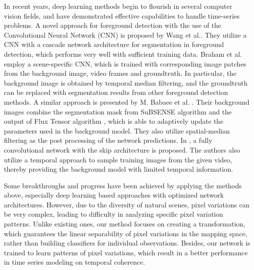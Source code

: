 \documentclass[journal]{IEEEtran}
\begin{document}
%
In recent years, deep learning methods begin to flourish in several computer vision fields, 
and have demonstrated effective capabilities to handle time-series problems\cite{Mobahi2009}\cite{LANGKVIST201411}. 
%
A novel approach for foreground detection with the use of the Convolutional Neural Network (CNN) is proposed by Wang et al.\cite{wang2016PRL}.
They utilize a CNN with a cascade network architecture for segmentation in foreground detection, which performs very well with sufficient training data.
%
Braham et al. \cite{Braham2016deep} employ a scene-specific CNN, which is trained with corresponding image patches from the background image, video frames and groundtruth. In particular, the background image is obtained by temporal median filtering, and the groundtruth can be replaced with segmentation results from other foreground detection methods.
A similar approach is presented by M. Babaee et al. \cite{Babaee2017deep}. Their background images combine the segmentation mask from SuBSENSE\cite{St-Charles2015SuBSENSE} algorithm and the output of Flux Tensor algorithm \cite{Wang2014FTSG}, which is able to adaptively update the parameters used in the background model. They also utilize spatial-median filtering as the post processing of the network predictions.
In \cite{Yang2018DBMF}, a fully convolutional network with the skip architecture is proposed. 
The authors also utilize a temporal approach to sample training images from the given video, 
thereby providing the background model with limited temporal information. 

Some breakthroughs and progress have been achieved by applying the methods above, especially deep learning based approaches with optimized network architectures. 
However, due to the diversity of natural scenes, pixel variations can be very complex, leading to difficulty in analyzing specific pixel variation patterns.
Unlike existing ones, our method focuses on creating a transformation, which guarantees the linear separability of pixel variations in the mapping space, rather than building classifiers for individual observations.
%
Besides, our network is trained to learn patterns of pixel variations, which result in a better performance in time series modeling on temporal coherence.
%
\end{document}
